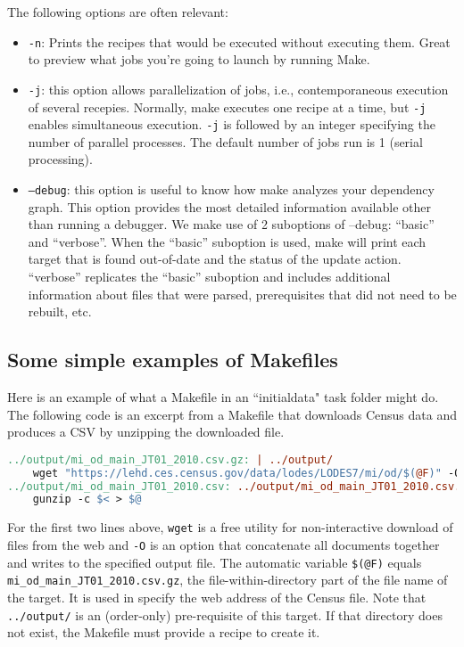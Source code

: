 The following options are often relevant:
\begin{itemize}
	\item \texttt{-n}: Prints the recipes that would be executed without executing them. Great to preview what jobs you're going to launch by running Make.
	\item \texttt{-j}: this option allows parallelization of jobs, i.e., contemporaneous execution of several recepies.
	Normally, make executes one recipe at a time, but \texttt{-j} enables simultaneous execution.
	\texttt{-j} is followed by an integer specifying the number of parallel processes.
	The default number of jobs run is 1 (serial processing).
	\item \texttt{--debug}: this option is useful to know how make analyzes your dependency graph. This option provides the most detailed information available other than running a debugger. We make use of 2 suboptions of --debug: ``basic'' and ``verbose''. When the ``basic'' suboption is used, make will print each target that is found out-of-date and the status of the update action. ``verbose'' replicates the ``basic'' suboption and includes additional information about files that were parsed, prerequisites that did not need to be rebuilt, etc. 
\end{itemize}

\subsection{Some simple examples of Makefiles}
Here is an example of what a Makefile in an ``initialdata" task folder might do.
The following code is an excerpt from a Makefile that downloads Census data and produces a CSV by unzipping the downloaded file.
\begin{lstlisting}[language=make]
../output/mi_od_main_JT01_2010.csv.gz: | ../output/
	wget "https://lehd.ces.census.gov/data/lodes/LODES7/mi/od/$(@F)" -O ../output/$(@F)
../output/mi_od_main_JT01_2010.csv: ../output/mi_od_main_JT01_2010.csv.gz
	gunzip -c $< > $@
\end{lstlisting}
For the first two lines above, \texttt{wget} is a free utility for non-interactive download of files from the web and \texttt{-O} is an option that concatenate all documents together and writes to the specified output file. 
The automatic variable \texttt{\$(@F)} equals \texttt{mi\_od\_main\_JT01\_2010.csv.gz},
the file-within-directory part of the file name of the target. 
It is used in specify the web address of the Census file.
Note that \texttt{../output/} is an (order-only) pre-requisite of this target.
If that directory does not exist, the Makefile must provide a recipe to create it.

